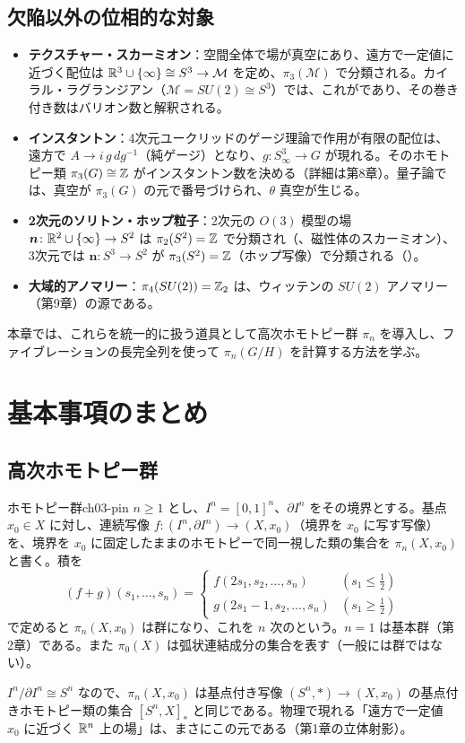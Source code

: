 \subsection*{欠陥以外の位相的な対象}
\begin{itemize}
\item \textbf{テクスチャー・スカーミオン}：空間全体で場が真空にあり、遠方で一定値に近づく配位は $\mathbb{R}^3\cup\{\infty\}\cong S^3\to\mathcal M$ を定め、$\pi_3(\mathcal M)$ で分類される。カイラル・ラグランジアン（$\mathcal M=SU(2)\cong S^3$）では、これがであり、その巻き付き数はバリオン数と解釈される。
\item \textbf{インスタントン}：4次元ユークリッドのゲージ理論で作用が有限の配位は、遠方で $A\to i\,g\,dg^{-1}$（純ゲージ）となり、$g\colon S^3_\infty\to G$ が現れる。そのホモトピー類 $\pi_3(G)\cong\mathbb{Z}$ がインスタントン数を決める（詳細は第8章）。量子論では、真空が $\pi_3(G)$ の元で番号づけられ、$\theta$ 真空が生じる。
\item \textbf{2次元のソリトン・ホップ粒子}：2次元の $O(3)$ 模型の場 $\bm n\colon\mathbb{R}^2\cup\{\infty\}\to S^2$ は $\pi_2(S^2)=\mathbb{Z}$ で分類され（、磁性体のスカーミオン）、3次元では $\bm n\colon S^3\to S^2$ が $\pi_3(S^2)=\mathbb{Z}$（ホップ写像）で分類される（）。
\item \textbf{大域的アノマリー}：$\pi_4(SU(2))=\mathbb{Z}_2$ は、ウィッテンの $SU(2)$ アノマリー（第9章）の源である。
\end{itemize}
本章では、これらを統一的に扱う道具として高次ホモトピー群 $\pi_n$ を導入し、ファイブレーションの長完全列を使って $\pi_n(G/H)$ を計算する方法を学ぶ。

\section{基本事項のまとめ}

\subsection{高次ホモトピー群}

\begin{mydef}{ホモトピー群}{ch03-pin}
$n\ge1$ とし、$I^n=[0,1]^n$、$\partial I^n$ をその境界とする。基点 $x_0\in X$ に対し、連続写像 $f\colon(I^n,\partial I^n)\to(X,x_0)$（境界を $x_0$ に写す写像）を、境界を $x_0$ に固定したままのホモトピーで同一視した類の集合を $\pi_n(X,x_0)$ と書く。積を
\[
(f+g)(s_1,\dots,s_n)=\begin{cases}f(2s_1,s_2,\dots,s_n)&(s_1\le\tfrac12)\\ g(2s_1-1,s_2,\dots,s_n)&(s_1\ge\tfrac12)\end{cases}
\]
で定めると $\pi_n(X,x_0)$ は群になり、これを $n$ 次のという。$n=1$ は基本群（第2章）である。また $\pi_0(X)$ は弧状連結成分の集合を表す（一般には群ではない）。
\end{mydef}
$I^n/\partial I^n\cong S^n$ なので、$\pi_n(X,x_0)$ は基点付き写像 $(S^n,*)\to(X,x_0)$ の基点付きホモトピー類の集合 $[S^n,X]_*$ と同じである。物理で現れる「遠方で一定値 $x_0$ に近づく $\mathbb{R}^n$ 上の場」は、まさにこの元である（第1章の立体射影）。

